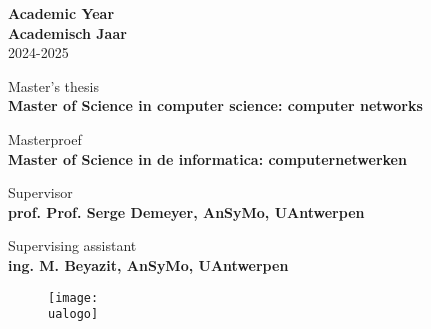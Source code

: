 
\thispagestyle{empty}
\sffamily %


\begin{flushright}
 {
	\textbf{Academic Year} \\
}{
	\textbf{Academisch Jaar} \\
}
2024-2025
\end{flushright}

\vspace{5cm}

\begin{flushleft}
\textcolor{white}{\colorbox{uawemain}
	{\Huge \emph{\thesisTitle}}}

\vspace{2cm}

{\Large \textbf{\studentName}}


\vspace{5cm}
 {
	Master's thesis \\ \textbf{Master of Science in computer science: computer networks}

}{
	Masterproef \\ \textbf{Master of Science in de informatica: computernetwerken}
}

\vspace{3cm}
Supervisor \\ \textbf{prof. Prof. Serge Demeyer, AnSyMo, UAntwerpen}

Supervising assistant \\ \textbf{ing. M. Beyazit, AnSyMo, UAntwerpen}

\end{flushleft}


\begin{figure}[b]
\texttt{[image: \\ualogo]}
\end{figure}
      

\newpage
\rmfamily %
~
\vfill %


